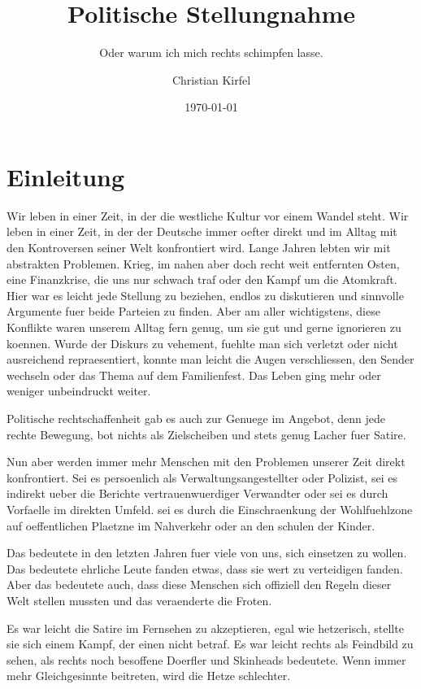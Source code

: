 \documentclass{turabian-researchpaper}
\title{Politische Stellungnahme}
\subtitle{Oder warum ich mich rechts schimpfen lasse.}
\author{Christian Kirfel}
\date{\today}
\begin{document}
\maketitle


\section{Einleitung}

Wir leben in einer Zeit, in der die westliche Kultur vor einem Wandel steht. Wir leben in einer Zeit, in der der Deutsche immer oefter direkt und im Alltag mit den Kontroversen seiner Welt konfrontiert wird. Lange Jahren lebten wir mit abstrakten Problemen. Krieg, im nahen aber doch recht weit entfernten Osten, eine Finanzkrise, die uns nur schwach traf oder den Kampf um die Atomkraft. Hier war es leicht jede Stellung zu beziehen, endlos zu diskutieren und sinnvolle Argumente fuer beide Parteien zu finden. Aber am aller wichtigstens, diese Konflikte waren unserem Alltag fern genug, um sie gut und gerne ignorieren zu koennen. Wurde der Diskurs zu vehement, fuehlte man sich verletzt oder nicht ausreichend repraesentiert, konnte man leicht die Augen verschliessen, den Sender wechseln oder das Thema auf dem Familienfest. Das Leben ging mehr oder weniger unbeindruckt weiter.

Politische rechtschaffenheit gab es auch zur Genuege im Angebot, denn jede rechte Bewegung, bot nichts als Zielscheiben und stets genug Lacher fuer Satire.

Nun aber werden immer mehr Menschen mit den Problemen unserer Zeit direkt konfrontiert. Sei es persoenlich als Verwaltungsangestellter oder Polizist, sei es indirekt ueber die Berichte vertrauenwuerdiger Verwandter oder sei es durch Vorfaelle im direkten Umfeld. sei es durch die Einschraenkung der Wohlfuehlzone auf oeffentlichen Plaetzne im Nahverkehr oder an den schulen der Kinder.

Das bedeutete in den letzten Jahren fuer viele von uns, sich einsetzen zu wollen. Das bedeutete ehrliche Leute fanden etwas, dass sie wert zu verteidigen fanden. Aber das bedeutete auch, dass diese Menschen sich offiziell den Regeln dieser Welt stellen mussten und das veraenderte die Froten.

Es war leicht die Satire im Fernsehen zu akzeptieren, egal wie hetzerisch, stellte sie sich einem Kampf, der einen nicht betraf. Es war leicht rechts als Feindbild zu sehen, als rechts noch besoffene Doerfler und Skinheads bedeutete. Wenn immer mehr Gleichgesinnte beitreten, wird die Hetze schlechter.
\end{document}
